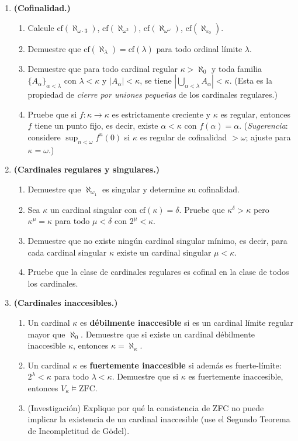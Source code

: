 \begin{enumerate}[leftmargin=2em, label=\textbf{\arabic*.}]
\item \textbf{(Cofinalidad.)}
\begin{enumerate}[label=(\alph*)]
  \item Calcule $\mathrm{cf}(\aleph_{\omega \cdot 3})$, $\mathrm{cf}(\aleph_{\omega^3})$, $\mathrm{cf}(\aleph_{\omega^\omega})$, $\mathrm{cf}(\aleph_{\varepsilon_0})$.
  \item Demuestre que $\mathrm{cf}(\aleph_\lambda) = \mathrm{cf}(\lambda)$ para todo ordinal límite $\lambda$.
  \item Demuestre que para todo cardinal regular $\kappa > \aleph_0$ y toda familia $\{A_\alpha\}_{\alpha < \lambda}$ con $\lambda < \kappa$ y $|A_\alpha| < \kappa$, se tiene $\left|\bigcup_{\alpha < \lambda} A_\alpha\right| < \kappa$. (Esta es la propiedad de \emph{cierre por uniones pequeñas} de los cardinales regulares.)
  \item Pruebe que si $f \colon \kappa \to \kappa$ es estrictamente creciente y $\kappa$ es regular, entonces $f$ tiene un punto fijo, es decir, existe $\alpha < \kappa$ con $f(\alpha) = \alpha$. (\emph{Sugerencia}: considere $\sup_{n<\omega} f^n(0)$ si $\kappa$ es regular de cofinalidad $> \omega$; ajuste para $\kappa = \omega$.)
\end{enumerate}

\item \textbf{(Cardinales regulares y singulares.)}
\begin{enumerate}[label=(\alph*)]
  \item Demuestre que $\aleph_{\omega_1}$ es singular y determine su cofinalidad.
  \item Sea $\kappa$ un cardinal singular con $\mathrm{cf}(\kappa) = \delta$. Pruebe que $\kappa^\delta > \kappa$ pero $\kappa^\mu = \kappa$ para todo $\mu < \delta$ con $2^\mu < \kappa$.
  \item Demuestre que no existe ningún cardinal singular mínimo, es decir, para cada cardinal singular $\kappa$ existe un cardinal singular $\mu < \kappa$.
  \item Pruebe que la clase de cardinales regulares es cofinal en la clase de todos los cardinales.
\end{enumerate}

\item \textbf{(Cardinales inaccesibles.)}
\begin{enumerate}[label=(\alph*)]
  \item Un cardinal $\kappa$ es \textbf{débilmente inaccesible} si es un cardinal límite regular mayor que $\aleph_0$. Demuestre que si existe un cardinal débilmente inaccesible $\kappa$, entonces $\kappa = \aleph_\kappa$.
  \item Un cardinal $\kappa$ es \textbf{fuertemente inaccesible} si además es fuerte-límite: $2^\lambda < \kappa$ para todo $\lambda < \kappa$. Demuestre que si $\kappa$ es fuertemente inaccesible, entonces $V_\kappa \models \text{ZFC}$.
  \item (Investigación) Explique por qué la consistencia de ZFC no puede implicar la existencia de un cardinal inaccesible (use el Segundo Teorema de Incompletitud de Gödel).
\end{enumerate}


\end{enumerate}
